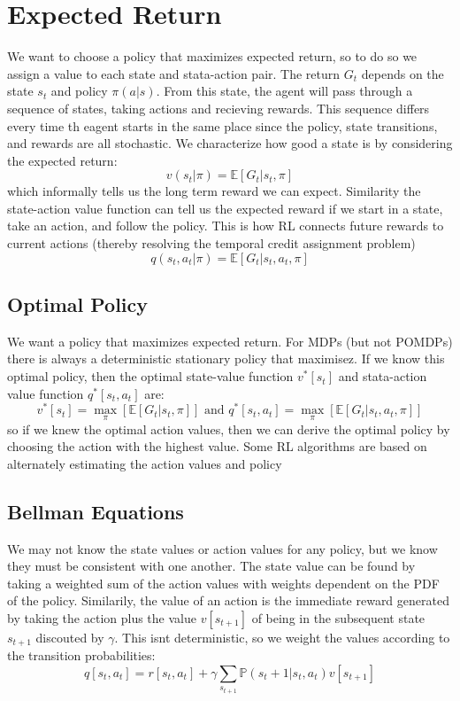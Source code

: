 \documentclass[11pt]{article}
\newcommand{\E}{\mathbb{E}}
\newcommand{\Pbb}{\mathbb{P}}
\begin{document}
\section{Expected Return}
We want to choose a policy that maximizes expected return, so to do so we assign a value to each state and stata-action pair. The return $G_t$ depends on the state $s_t$ and policy $\pi (a|s)$. From this state, the agent will pass through a sequence of states, taking actions and recieving rewards. This sequence differs every time th eagent starts in the same place since the policy, state transitions, and rewards are all stochastic. We characterize how good a state is by considering the expected return:
\[
v(s_t | \pi) = \E [G_t | s_t, \pi]
\]
which informally tells us the long term reward we can expect. Similarity the state-action value function can tell us the expected reward if we start in a state, take an action, and follow the policy. This is how RL connects future rewards to current actions (thereby resolving the temporal credit assignment problem)
\[
q(s_t , a_t| \pi) = \E [G_t | s_t, a_t, \pi]
\]

\subsection{Optimal Policy}
We want a policy that maximizes expected return. For MDPs (but not POMDPs) there is always a deterministic stationary policy that maximisez. If we know this optimal policy, then the optimal state-value function $ v^* [s_t]$ and stata-action value function $ q^* [s_t, a_t]$ are:
\[v^* [s_t]=\max_\pi [\E [G_t | s_t, \pi]] \text{ and } q^* [s_t,a_t]=\max_\pi [\E [G_t | s_t,a_t, \pi]]\]
so if we knew the optimal action values, then we can derive the optimal policy by choosing the action with the highest value. Some RL algorithms are based on alternately estimating the action values and policy

\subsection{Bellman Equations}
We may not know the state values or action values for any policy, but we know they must be consistent with one another. The state value can be found by taking a weighted sum of the action values with weights dependent on the PDF of the policy. Similarily, the value of an action is the immediate reward generated by taking the action plus the value $v [s_{t+1}]$ of being in the subsequent state $s_{t+1}$ discouted by $\gamma$. This isnt deterministic, so we weight the values according to the transition probabilities:
\[q[s_t,a_t]=r[s_t,a_t]+\gamma \sum_{s_{t+1}}\Pbb (s_t+1|s_t,a_t)v[s_{t+1}]\]
\end{document}
